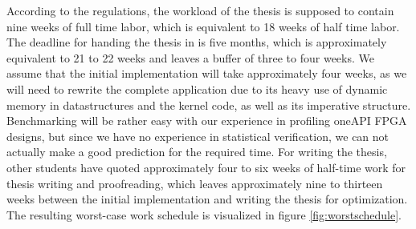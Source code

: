According to the regulations, the workload of the thesis is supposed to contain nine weeks of full time labor, which is equivalent to 18 weeks of half time labor. The deadline for handing the thesis in is five months, which is approximately equivalent to 21 to 22 weeks and leaves a buffer of three to four weeks. We assume that the initial implementation will take approximately four weeks, as we will need to rewrite the complete application due to its heavy use of dynamic memory in datastructures and the kernel code, as well as its imperative structure. Benchmarking will be rather easy with our experience in profiling oneAPI FPGA designs, but since we have no experience in statistical verification, we can not actually make a good prediction for the required time. For writing the thesis, other students have quoted approximately four to six weeks of half-time work for thesis writing and proofreading, which leaves approximately nine to thirteen weeks between the initial implementation and writing the thesis for optimization. The resulting worst-case work schedule is visualized in figure \ref{fig:worstschedule}.
